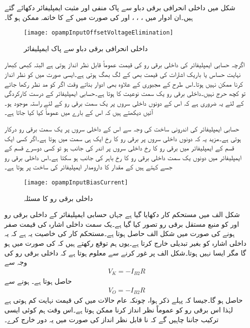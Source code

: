 شکل  میں داخلی انحرافی برقی دباو سے پاک منفی اور مثبت ایمپلیفائر دکھائے گئے ہیں۔ان ادوار میں ، ، ،  اور   کی صورت میں  کے  کا خاتمہ ممکن ہو گا۔ 
\begin{figure}
\centering
\texttt{[image: opampInputOffsetVoltageElimination]}
\caption{داخلی انحرافی برقی دباو سے پاک ایمپلیفائر}
\label{شکل_داخلی_انحرافی_برقی_دباو_سے_پاک_ایمپلیفائر}
\end{figure}
 

اگرچہ حسابی ایمپلیفائر کی داخلی برقی رو   کی قیمت عموماً قابل نظر انداز ہوتی ہے البتہ کبھی کبھار نہایت حساس یا باریک اشارات کی قیمت بھی کے لگ بھگ ہوتی ہے۔ایسی صورت میں کو نظر انداز کرنا ممکن نہیں ہوتا۔اس طرح کے مجبوری کے علاوہ بھی ادوار بناتے وقت اگر  کو مد نظر رکھا جائے تو کچھ حرج نہیں۔داخلی برقی رو یک سمت نوعیت کا ہوتا ہے۔حسابی ایمپلیفائر کے درست کارکردگی کے لئے یہ ضروری ہے کہ اس کے دونوں داخلی سروں  پر یک سمت برقی رو کے لئے راستہ موجود ہو۔آئیں دیکھتے ہیں کہ اس  کے بارے میں عموماً کیا کیا جاتا ہے۔

حسابی ایمپلیفائر کی اندرونی ساخت کی وجہ سے اس کے داخلی سروں پر یک سمت برقی رو درکار ہوتی ہے۔مزید یہ کہ دونوں داخلی سروں پر برقی رو کا رخ ایک ہی سمت میں ہوتا ہے۔اگر کسی ایک قسم کے ایمپلیفائر میں برقی رو کا رخ داخلی سروں پر اندر کی جانب ہو تو کسی دوسرے قسم کے ایمپلیفائر میں دونوں یک سمت داخلی برقی رو کا رخ باہر  کی جانب ہو سکتا ہے۔اس داخلی برقی رو جسے  کہتے ہیں کے مقدار کا دارومدار ایمپلیفائر کی ساخت پر ہوتا ہے۔
\begin{figure}
\centering
\texttt{[image: opampInputBiasCurrent]}
\caption{داخلی برقی رو کا مسئلہ}
\label{شکل_داخلی_برقی_رو_کا_مسئلہ}
\end{figure}
شکل  الف میں مستحکم کار دکھایا گیا ہے جہاں حسابی ایمپلیفائر کے داخلی برقی رو  اور کو منبع مستقل برقی رو  تصور کیا گیا ہے۔یک سمت داخلی اشارہ  کی قیمت صفر ہونے کی صورت میں  شکل  الف     حاصل ہوتا  ہے۔مستحکم کار کی خاصیت یہ ہے کہ یہ داخلی اشارہ کو بغیر تبدیلی خارج کرتا ہے۔یوں ہم توقع رکھتے ہیں کہ  کی صورت میں  ہو گا مگر ایسا نہیں ہوتا۔شکل  الف     پر غور کرنے سے معلوم ہوتا ہے کہ داخلی برقی رو کی وجہ سے
\begin{align*}
V_K=-I_{B2} R
\end{align*}
حاصل ہوتا ہے۔  ہونے سے
\begin{align} \label{مساوات_انحرافی_رو_سے_پیدا_دباو}
V_O=-I_{B2}R
\end{align}
حاصل ہو گا۔جیسا کہ پہلے ذکر ہوا، چونکہ عام حالات میں  کی قیمت نہایت کم ہوتی ہے لہٰذا اس برقی رو کو عموماً نظر انداز کرنا ممکن ہوتا ہے۔اس وقت ہم کوئی ایسی ترکیب جاننا چاہیں گے کہ نا قابل نظر انداز  کی صورت میں یہ دور خارج کرے۔

